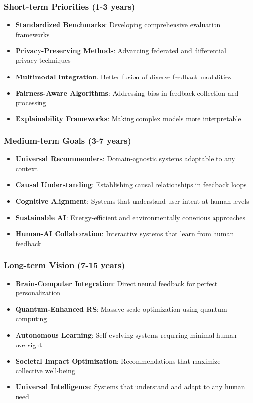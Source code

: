 \documentclass[acmsmall,review,anonymous]{acmart}
\begin{document}
\subsubsection{Short-term Priorities (1-3 years)}

\begin{itemize}
    \item \textbf{Standardized Benchmarks}: Developing comprehensive evaluation frameworks
    \item \textbf{Privacy-Preserving Methods}: Advancing federated and differential privacy techniques
    \item \textbf{Multimodal Integration}: Better fusion of diverse feedback modalities
    \item \textbf{Fairness-Aware Algorithms}: Addressing bias in feedback collection and processing
    \item \textbf{Explainability Frameworks}: Making complex models more interpretable
\end{itemize}

\subsubsection{Medium-term Goals (3-7 years)}

\begin{itemize}
    \item \textbf{Universal Recommenders}: Domain-agnostic systems adaptable to any context
    \item \textbf{Causal Understanding}: Establishing causal relationships in feedback loops
    \item \textbf{Cognitive Alignment}: Systems that understand user intent at human levels
    \item \textbf{Sustainable AI}: Energy-efficient and environmentally conscious approaches
    \item \textbf{Human-AI Collaboration}: Interactive systems that learn from human feedback
\end{itemize}

\subsubsection{Long-term Vision (7-15 years)}

\begin{itemize}
    \item \textbf{Brain-Computer Integration}: Direct neural feedback for perfect personalization
    \item \textbf{Quantum-Enhanced RS}: Massive-scale optimization using quantum computing
    \item \textbf{Autonomous Learning}: Self-evolving systems requiring minimal human oversight
    \item \textbf{Societal Impact Optimization}: Recommendations that maximize collective well-being
    \item \textbf{Universal Intelligence}: Systems that understand and adapt to any human need
\end{itemize}
\end{document}
